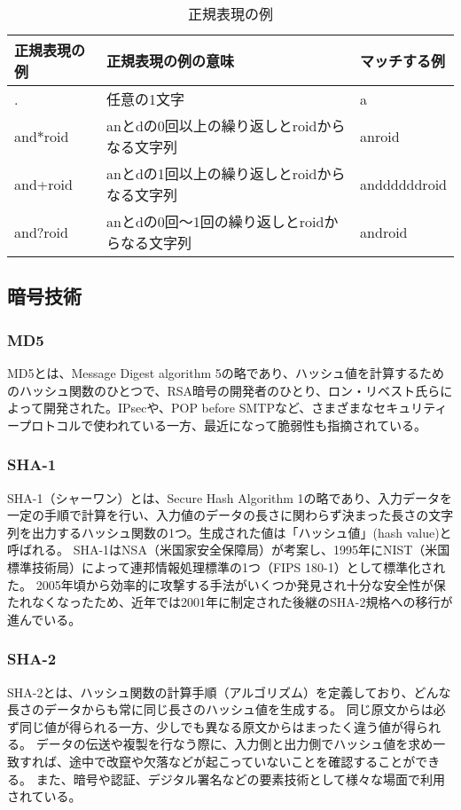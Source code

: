 \begin{table}[t]
\begin{center}
\caption{正規表現の例}
\begin{tabular}{lll} \hline
正規表現の例 & 正規表現の例の意味 & マッチする例 \\ \hline
. & 任意の1文字 & a \\
and$\ast$roid & anとdの0回以上の繰り返しとroidからなる文字列 & anroid \\
and+roid & anとdの1回以上の繰り返しとroidからなる文字列 & anddddddroid \\
and?roid & anとdの0回～1回の繰り返しとroidからなる文字列 & android \\ \hline
\end{tabular}
\label{tb:RegularExpression2}
\end{center}
\end{table}


\subsection{暗号技術}

\subsubsection {MD5}
MD5とは、Message Digest algorithm 5の略であり、ハッシュ値を計算するためのハッシュ関数のひとつで、RSA暗号の開発者のひとり、ロン・リベスト氏らによって開発された。IPsecや、POP before SMTPなど、さまざまなセキュリティープロトコルで使われている一方、最近になって脆弱性も指摘されている。

\subsubsection {SHA-1}
SHA-1（シャーワン）とは、Secure Hash Algorithm 1の略であり、入力データを一定の手順で計算を行い、入力値のデータの長さに関わらず決まった長さの文字列を出力するハッシュ関数の1つ。生成された値は「ハッシュ値」(hash value)と呼ばれる。
SHA-1はNSA（米国家安全保障局）が考案し、1995年にNIST（米国標準技術局）によって連邦情報処理標準の1つ（FIPS 180-1）として標準化された。
2005年頃から効率的に攻撃する手法がいくつか発見され十分な安全性が保たれなくなったため、近年では2001年に制定された後継のSHA-2規格への移行が進んでいる。

\subsubsection{SHA-2}
SHA-2とは、ハッシュ関数の計算手順（アルゴリズム）を定義しており、どんな長さのデータからも常に同じ長さのハッシュ値を生成する。
同じ原文からは必ず同じ値が得られる一方、少しでも異なる原文からはまったく違う値が得られる。
データの伝送や複製を行なう際に、入力側と出力側でハッシュ値を求め一致すれば、途中で改竄や欠落などが起こっていないことを確認することができる。
また、暗号や認証、デジタル署名などの要素技術として様々な場面で利用されている。　


